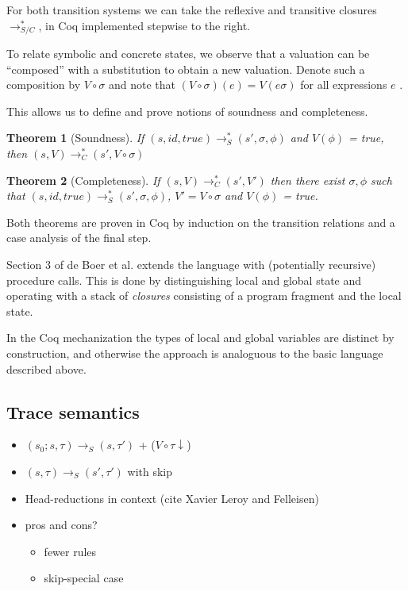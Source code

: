 \documentclass[submission,copyright,creativecommons]{eptcs}
\newcommand{\note}[1]{\color{WildStrawberry}{#1}\color{black}}
\newtheorem{theorem}{Theorem}
\begin{document}
For both transition systems we can take the reflexive and transitive closures $\rightarrow_{S/C}^{*}$,
in Coq implemented stepwise to the right.

To relate symbolic and concrete states, we observe that a valuation can be ``composed'' with a substitution
to obtain a new valuation. Denote such a composition by $V \circ \sigma$ and note that $(V \circ \sigma)(e) = V(e\sigma)$
for all expressions $e$ \note{(proof by induction on expressions)}.

This allows us to define and prove notions of soundness and completeness.
\begin{theorem}[Soundness]
  If $(s, id, true) \rightarrow_{S}^{*} (s', \sigma, \phi)$ and $V(\phi)$ = true,
  then $(s, V) \rightarrow_{C}^{*} (s', V \circ \sigma)$
\end{theorem}

\begin{theorem}[Completeness]
  If $(s, V) \rightarrow_{C}^{*} (s', V')$ then there exist $\sigma, \phi$ such that
  $(s, id, true) \rightarrow_{S}^{*} (s', \sigma, \phi)$, $V' = V \circ \sigma$ and $V(\phi)$ = true.
\end{theorem}

Both theorems are proven in Coq by induction on the transition relations and a case analysis of the final step.

Section 3 of de Boer et al. extends the language with (potentially recursive) procedure calls.
This is done by distinguishing local and global state and operating with a stack of \emph{closures} consisting
of a program fragment and the local state.

In the Coq mechanization the types of local and global variables are distinct by construction, and otherwise
the approach is analoguous to the basic language described above.

\subsection*{Trace semantics}
\begin{itemize}
  \item $(s_{0} ; s, \tau) \rightarrow_{S} (s, \tau')$ + ($V \circ \tau\downarrow$)
  \item $(s, \tau) \rightarrow_{S} (s', \tau')$  with skip
  \item Head-reductions in context (cite Xavier Leroy and Felleisen)
  \item pros and cons?
        \begin{itemize}
          \item fewer rules
          \item skip-special case
        \end{itemize}
\end{itemize}
\end{document}
